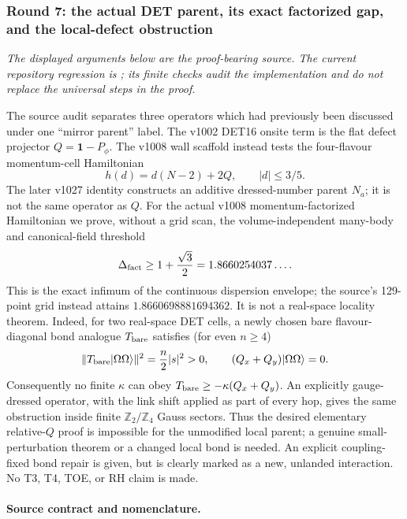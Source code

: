 \subsubsection*{Round 7: the actual DET parent, its exact factorized gap, and the local-defect obstruction}
\label{sec:toe-r7-mirror}
\noindent\emph{The displayed arguments below are the proof-bearing source.  The current
repository regression is ; its finite checks audit the
implementation and do not replace the universal steps in the proof.}

\begingroup
\def\cH{\mathcal H}
\def\1{\mathbf 1}
\def\spec{\operatorname{spec}}
\def\ket#1{|#1\rangle}
\def\bra#1{\langle#1|}
\begin{keybox}
The source audit separates three operators which had previously been discussed
under one ``mirror parent'' label.  The v1002 DET16 onsite term is the flat
defect projector $Q=\1-P_\phi$.  The v1008 wall scaffold instead tests the
four-flavour momentum-cell Hamiltonian
\[
 h(d)=d(N-2)+2Q,\qquad |d|\leq 3/5.
\]
The later v1027 identity constructs an additive dressed-number parent $N_a$;
it is not the same operator as $Q$.  For the actual v1008 momentum-factorized
Hamiltonian we prove, without a grid scan, the volume-independent many-body and
canonical-field threshold
\[
 \Delta_{\rm fact}\geq 1+\frac{\sqrt3}{2}=1.8660254037\ldots.
\]
This is the exact infimum of the continuous dispersion envelope; the source's
129-point grid instead attains $1.8660698881694362$.  It is not a real-space
locality theorem.  Indeed, for two real-space DET cells, a newly chosen bare
flavour-diagonal bond analogue $T_{\rm bare}$ satisfies (for even $n\geq4$)
\[
 \|T_{\rm bare}\ket{\Omega\Omega}\|^2=\frac n2|s|^2>0,
 \qquad (Q_x+Q_y)\ket{\Omega\Omega}=0.
\]
Consequently no finite $\kappa$ can obey
$T_{\rm bare}\geq-\kappa(Q_x+Q_y)$.  An explicitly gauge-dressed operator,
with the link shift applied as part of every hop, gives the same obstruction
inside finite $\mathbb Z_2/\mathbb Z_4$ Gauss sectors.  Thus the
desired elementary relative-$Q$ proof is impossible for the unmodified local
parent; a genuine small-perturbation theorem or a changed local bond is needed.
An explicit coupling-fixed bond repair is given, but is clearly marked as a
new, unlanded interaction.  No T3, T4, TOE, or RH claim is made.
\end{keybox}

\paragraph{Source contract and nomenclature.}

